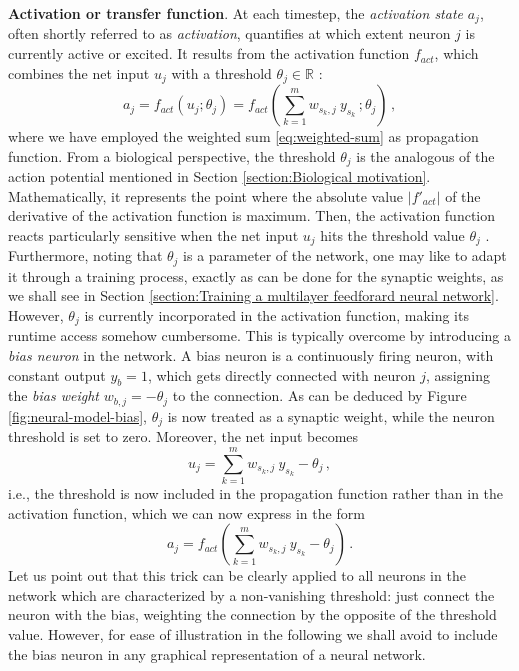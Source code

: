 \documentclass[12pt, a4paper, twoside, openright]{report}
\numberwithin{equation}{chapter}
\theoremstyle{theorem}
\theoremstyle{definition}
\theoremstyle{remark}
\theoremstyle{proposition}
\numberwithin{figure}{chapter}
\begin{document}
		\noindent \textbf{Activation or transfer function}. At each timestep, the \emph{activation state} $a_j$, often shortly referred to as \emph{activation}, quantifies at which extent neuron $j$ is currently active or excited. It results from the activation function $f_{act}$, which combines the net input $u_j$ with a threshold $\theta_j \in \mathbb{R}$ \cite{Kri}: 
		\begin{equation}
			\label{eq:activation-function}
			a_j = f_{act}(u_j; \theta_j) = f_{act}(\sum_{k = 1}^m w_{s_k,j} ~ y_{s_k} \, ; \theta_j) \, ,
		\end{equation}
		where we have employed the weighted sum \eqref{eq:weighted-sum} as propagation function. From a biological perspective, the threshold $\theta_j$ is the analogous of the action potential mentioned in Section \ref{section:Biological motivation}. Mathematically, it represents the point where the absolute value $|f'_{act}|$ of the derivative of the activation function is maximum. Then, the activation function reacts particularly sensitive when the net input $u_j$ hits the threshold value $\theta_j$ \cite{Kri}. \\
		Furthermore, noting that $\theta_j$ is a parameter of the network, one may like to adapt it through a training process, exactly as can be done for the synaptic weights, as we shall see in Section \ref{section:Training a multilayer feedforard neural network}. However, $\theta_j$ is currently incorporated in the activation function, making its runtime access somehow cumbersome. This is typically overcome by introducing a \emph{bias neuron} in the network. A bias neuron is a continuously firing neuron, with constant output $y_{b} = 1$, which gets directly connected with neuron $j$, assigning the \emph{bias weight} $w_{b,j} = - \theta_j$ to the connection. As can be deduced by Figure \ref{fig:neural-model-bias}, $\theta_j$ is now treated as a synaptic weight, while the neuron threshold is set to zero. Moreover, the net input becomes
		\begin{equation}
			\label{eq:net-input}
			u_j = \sum_{k = 1}^m w_{s_k,j} ~ y_{s_k} - \theta_j \, ,
		\end{equation}
		i.e., the threshold is now included in the propagation function rather than in the activation function, which we can now express in the form
		\begin{equation}
			a_j = f_{act}(\sum_{k = 1}^m w_{s_k,j} ~ y_{s_k} - \theta_j) \, .
		\end{equation}
		Let us point out that this trick can be clearly applied to all neurons in the network which are characterized by a non-vanishing threshold: just connect the neuron with the bias, weighting the connection by the opposite of the threshold value. However, for ease of illustration in the following we shall avoid to include the bias neuron in any graphical representation of a neural network.
		
\end{document}
